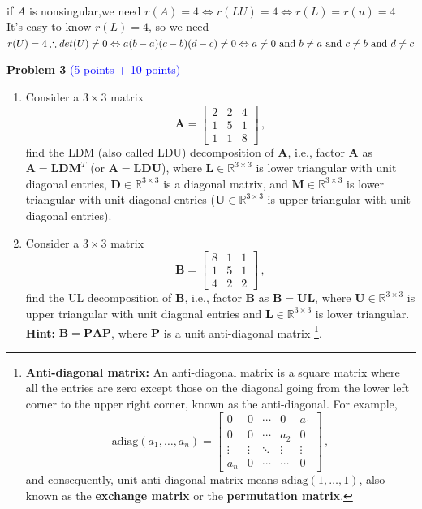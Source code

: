 \documentclass[english,onecolumn]{IEEEtran}
\begin{document}
\\if $A$ is nonsingular,we need 
$r(A)=4 \Leftrightarrow r(L U)=4 \Leftrightarrow r(L)=r(u)=4$\\
It's easy to know $r(L)=4$, so we need $r(U)=4
\therefore d e t(U) \neq 0 \Leftrightarrow a(b-a)(c-b)(d-c) \neq 0\\
\Leftrightarrow a \neq 0 \text { and } b \neq a \text { and } c \neq b \text { and } d \neq c$





\newpage
\noindent\textbf{Problem 3} \textcolor{blue}{(5 points + 10 points)}
\begin{enumerate}
	\item Consider a $3\times 3$ matrix
	\[
	\mathbf{A} = \begin{bmatrix}
		2& 2&4 \\
		1&5&1\\
		1&1&8
	\end{bmatrix}\,,
	\] find the LDM (also called LDU) decomposition of $\mathbf{A}$, i.e., factor $\mathbf{A}$ as $\mathbf{A}=\mathbf{L}\mathbf{D}\mathbf{M}^T$ (or $\mathbf{A}=\mathbf{L}\mathbf{D}\mathbf{U}$), where $\mathbf{L}\in\mathbb{R}^{3\times 3}$ is lower triangular with unit diagonal entries, $\mathbf{D}\in\mathbb{R}^{3\times 3}$  is  a diagonal matrix, and $\mathbf{M}\in\mathbb{R}^{3\times 3}$ is lower triangular with unit diagonal entries ($\mathbf{U}\in\mathbb{R}^{3\times 3}$ is upper triangular with unit diagonal entries).
	
	\item Consider a $3\times 3$ matrix
	\[
	\mathbf{B} = \begin{bmatrix}
		8& 1&1 \\
		1&5&1\\
		4&2&2
	\end{bmatrix}\,,
	\] find the UL decomposition  of $\mathbf{B}$, 
	i.e., factor $\mathbf{B}$ as $\mathbf{B} = \mathbf{UL}$,
	where $\mathbf{U}\in\mathbb{R}^{3\times 3}$ is upper triangular with unit diagonal entries and $\mathbf{L}\in\mathbb{R}^{3\times 3}$ is lower triangular.\\
	\textbf{Hint:}  $\mathbf{B}=\mathbf{P}\mathbf{A}\mathbf{P}$, where $\mathbf{P}$ is a unit anti-diagonal matrix \footnote{{\textbf{Anti-diagonal matrix:} An anti-diagonal matrix is a square matrix where all the entries are zero except those on the diagonal going from the lower left corner to the upper right corner, known as the anti-diagonal. For example, 
			\[
			\text{adiag}(a_1,\ldots,a_n) = \begin{bmatrix}
				0 & 0 & \cdots & 0 & a_1 \\
				0 & 0 & \cdots  & a_2 & 0 \\
				\vdots &  \vdots & \ddots & \vdots &\vdots \\
				a_n & 0 & \cdots &  \cdots& 0
			\end{bmatrix}\,,
			\]
			and consequently, unit anti-diagonal matrix means $\text{adiag}(1,\ldots,1)$, also known as the \textbf{exchange matrix} or the \textbf{permutation matrix}. 
	}}.
\end{enumerate}
\end{document}
